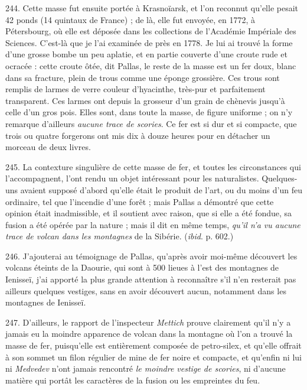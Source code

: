 \documentclass[a4paper, 11pt, oneside, polutonikogreek, french]{article}
\begin{document}
244. Cette masse fut ensuite portée à Krasnoïarsk, et l'on reconnut qu'elle pesait 42 ponds (14 quintaux de France) ; de là, elle fut envoyée, en 1772, à Pétersbourg, où elle est déposée dans les collections de l'Académie Impériale des Sciences. C'est-là que je l'ai examinée de près en 1778. Je lui ai trouvé la forme d'une grosse bombe un peu aplatie, et en partie couverte d'une croute rude et ocracée : \og cette croute ôtée, dit Pallas, le reste de la masse est un fer doux, blanc dans sa fracture, plein de trous comme une éponge grossière. Ces trous sont remplis de larmes de verre couleur d'hyacinthe, très-pur et parfaitement transparent. Ces larmes ont depuis la grosseur d'un grain de chènevis jusqu'à celle d'un gros pois. Elles sont, dans toute la masse, de figure uniforme ; on n'y remarque d'ailleurs \emph{aucune trace de scories}. Ce fer est si dur et si compacte, que trois ou quatre forgerons ont mis dix à douze heures pour en détacher un morceau de deux livres. \fg

245. La contexture singulière de cette masse de fer, et toutes les circonstances qui l’accompagnent, l'ont rendu un objet intéressant pour les naturalistes. Quelques-uns avaient supposé d'abord qu'elle était le produit de l'art, ou du moins d'un feu ordinaire, tel que l'incendie d'une forêt ; mais Pallas a démontré que cette opinion était inadmissible, et il soutient avec raison, que si elle a été fondue, sa fusion a été opérée par la nature ; mais il dit en même temps, \emph{qu'il n'a vu aucune trace de volcan dans les montagnes} de la Sibérie. (\emph{ibid}. p. 602.)

246. J'ajouterai au témoignage de Pallas, qu'après avoir moi-même découvert les volcans éteints de la Daourie, qui sont à 500 lieues à l'est des montagnes de Ienisseï, j'ai apporté la plus grande attention à reconnaître s'il n'en resterait pas ailleurs quelques vestiges, sans en avoir découvert aucun, notamment dans les montagnes de Ienisseï.

247. D'ailleurs, le rapport de l'inspecteur \emph{Mettich} prouve clairement qu'il n'y a jamais eu la moindre apparence de volcan dans la montagne où l'on a trouvé la masse de fer, puisqu'elle est entièrement composée de petro-silex, et qu'elle offrait à son sommet un filon régulier de mine de fer noire et compacte, et qu'enfin ni lui ni \emph{Medvedev} n'ont jamais rencontré \emph{le moindre vestige de scories}, ni d'aucune matière qui portât les caractères de la fusion ou les empreintes du feu.
\end{document}

